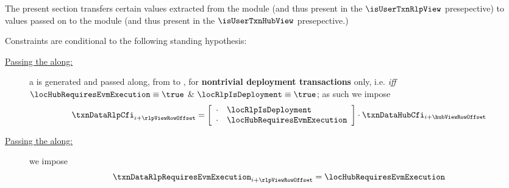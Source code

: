 \begin{center}
\end{center}
The present section transfers certain values
extracted from the \rlpTxnMod{} module (and thus present in the $\isUserTxnRlpView$ presepective) to
values passed on to the \hubMod{} module (and thus present in the $\isUserTxnHubView$ presepective.)

Constraints are conditional to the following standing hypothesis:
\begin{description}
	\item[\underline{Passing the \cfi{} along:}]
		a \cfi{} is generated and passed along,
		from \hubMod{} to \rlpTxnMod{}, for
		\textbf{nontrivial deployment transactions} only,
		i.e. \emph{iff}
		$\locHubRequiresEvmExecution \equiv \true$ \&
		$\locRlpIsDeployment \equiv \true$;
		as such we impose
		\[
			\txnDataRlpCfi  _{i + \rlpViewRowOffset} =
			\left[ \begin{array}{cl}
				\cdot & \locRlpIsDeployment         \\
				\cdot & \locHubRequiresEvmExecution \\
			\end{array} \right]
			\cdot
			\txnDataHubCfi _{i + \hubViewRowOffset}
		\]
	\item[\underline{Passing the \requiresEvmExecutionName{} along:}]
		we impose
		\[
			\txnDataRlpRequiresEvmExecution _{i + \rlpViewRowOffset}
			=
			\locHubRequiresEvmExecution
		\]
\end{description}
